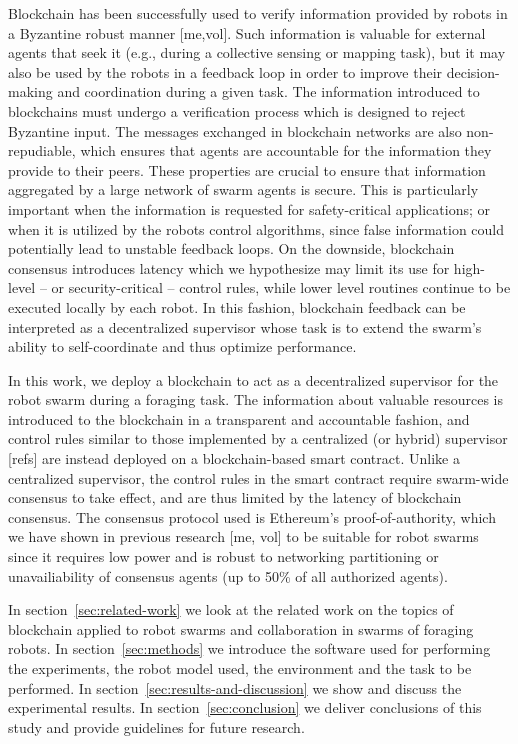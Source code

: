 \documentclass[runningheads]{llncs}
\newcommand{\poa}{proof-of-authority\xspace}
\begin{document}
 Blockchain has been successfully used to verify information provided by robots in a Byzantine robust manner [me,vol]. Such information is valuable for external agents that seek it (e.g., during a collective sensing or mapping task), but it may also be used by the robots in a feedback loop in order to improve their decision-making and coordination during a given task. The information introduced to blockchains must undergo a verification process which is designed to reject Byzantine input. The messages exchanged in blockchain networks are also non-repudiable, which ensures that agents are accountable for the information they provide to their peers. These properties are crucial to ensure that information aggregated by a large network of swarm agents is secure. This is particularly important when the information is requested for safety-critical applications; or when it is utilized by the robots control algorithms, since false information could potentially lead to unstable feedback loops. On the downside, blockchain consensus introduces latency which we hypothesize may limit its use for high-level -- or security-critical -- control rules, while lower level routines continue to be executed locally by each robot. In this fashion, blockchain feedback can be interpreted as a decentralized supervisor whose task is to extend the swarm's ability to self-coordinate and thus optimize performance.
 
 
 In this work, we deploy a blockchain to act as a decentralized supervisor for the robot swarm during a foraging task. The information about valuable resources is introduced to the blockchain in a transparent and accountable fashion, and control rules similar to those implemented by a centralized (or hybrid) supervisor [refs] are instead deployed on a blockchain-based smart contract. Unlike a centralized supervisor, the control rules in the smart contract require swarm-wide consensus to take effect, and are thus limited by the latency of blockchain consensus. The consensus protocol used is Ethereum's \poa, which we have shown in previous research [me, vol] to be suitable for robot swarms since it requires low power and is robust to networking partitioning or unavailiability of consensus agents (up to 50\% of all authorized agents).
 
 In section~\ref{sec:related-work} we look at the related work on the topics of blockchain applied to robot swarms and collaboration in swarms of foraging robots. In section~\ref{sec:methods} we introduce the software used for performing the experiments, the robot model used, the environment and the task to be performed. In section~\ref{sec:results-and-discussion} we show and discuss the experimental results. In section~\ref{sec:conclusion} we deliver conclusions of this study and provide guidelines for future research.
\end{document}
